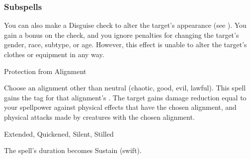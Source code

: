 \subsubsection{Subspells}
You can also make a Disguise check to alter the target's appearance (see ).
You gain a  bonus on the check, and you ignore penalties for changing the target's gender, race, subtype, or age.
However, this effect is unable to alter the target's clothes or equipment in any way.
\begin{spellsection}{Protection from Alignment}
\begin{spellcontent}
\begin{spelltargetinginfo}
\end{spelltargetinginfo}
\begin{spelleffects}
\spellspecial
Choose an alignment other than neutral (chaotic, good, evil, lawful).
This spell gains the tag for that alignment's .
\spelleffect
The target gains damage reduction equal to your spellpower against physical effects that have the chosen alignment, and physical attacks made by creatures with the chosen alignment.
\end{spelleffects}
\end{spellcontent}
\begin{spellfooter}
 Extended, Quickened, Silent, Stilled
\end{spellfooter}
\begin{spellsubcontent}
\begin{spellcantrip}
The spell's duration becomes Sustain (swift).
\end{spellcantrip}
\end{spellsubcontent}
\end{spellsection}
